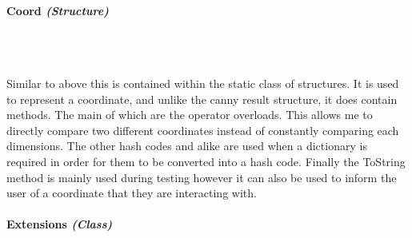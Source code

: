 \begin{FlushLeft}
    \paragraph{Coord \textit{(Structure)}} \mbox{} \\

    \begin{figure}[H]
        \centering
    \end{figure}\\

    Similar to above this is contained within the static class of structures. It is used to represent a coordinate, and unlike the canny result structure, it does contain methods. The main of which are the operator overloads. This allows me to directly compare two different coordinates instead of constantly comparing each dimensions. The other hash codes and alike are used when a dictionary is required in order for them to be converted into a hash code. Finally the ToString method is mainly used during testing however it can also be used to inform the user of a coordinate that they are interacting with.

    \bk

    \paragraph{Extensions \textit{(Class)}} \mbox{} \\

    \begin{figure}[H]
        \centering
    \end{figure}\\


\end{FlushLeft}
